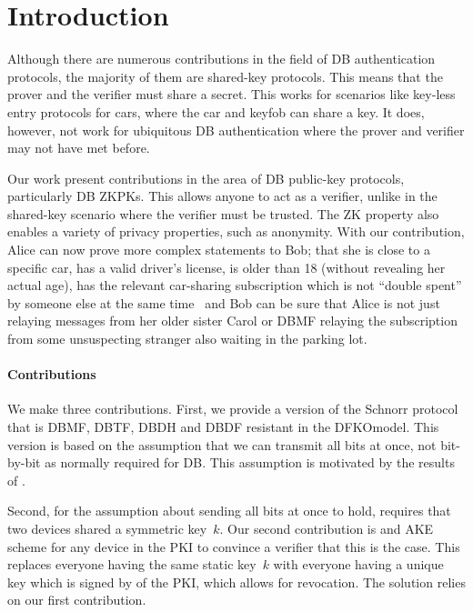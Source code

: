 \section{Introduction}%
\label{Introduction}

Although there are numerous contributions in the field of \ac{DB} 
authentication protocols, the majority of them are shared-key protocols.
This means that the prover and the verifier must share a secret.
This works for scenarios like key-less entry protocols for cars, where the car and keyfob 
can share a key.
It does, however, not work for ubiquitous \ac{DB} authentication where
the prover and verifier may not have met before.

Our work present contributions in the area of \ac{DB} public-key protocols, 
particularly \ac{DB} \acp{ZKPK}.
This allows anyone to act as a verifier, unlike in the shared-key scenario 
where the verifier must be trusted.
The \ac{ZK} property also enables a variety of privacy properties, such as 
anonymity.
With our contribution, Alice can
now prove more complex statements to Bob; \eg that she is close to a specific car, has a valid driver's license, is older than 18 
(without revealing her actual age), has the relevant car-sharing subscription which is not 
\enquote{double spent} by someone else at the same time~\cite[\eg][]{AnonPass} 
and  Bob can be sure that Alice is not just relaying messages 
from her older sister Carol or \ac{DBMF} relaying the subscription from some 
unsuspecting stranger also waiting in the parking lot.


\paragraph*{Contributions}

We make three contributions.
First, we provide a version of the Schnorr protocol that is \ac{DBMF}, 
\ac{DBTF}, \ac{DBDH} and \ac{DBDF} resistant in the \ac{DFKOmodel}.
This version is based on the assumption that we can transmit all bits at once, 
not bit-by-bit as normally required for \ac{DB}.
This assumption is motivated by the results of \textcite{UWBPR}.

Second, for the assumption about sending all bits at once to hold, 
\textcite{UWBPR} requires that two devices shared a symmetric key~\(k\).
Our second contribution is  and \ac{AKE} scheme for any device in 
the \ac{PKI} to convince a verifier that this is the case.
This replaces everyone having the same static key~\(k\) with everyone having a 
unique key which is signed by  of the \ac{PKI}, which allows for 
revocation.
The solution relies on our first contribution.

